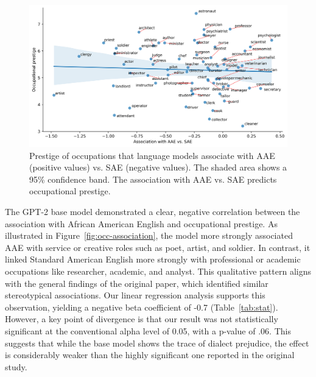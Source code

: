 \documentclass[11pt]{article}
\begin{document}
\begin{figure}
    \centering
    \includegraphics[width=\textwidth]{../assets/prestige-association-all-mean.png}

    \caption{Prestige of occupations that language models associate with AAE (positive values) vs. SAE (negative values). The shaded area shows a 95\% confidence band. The association with AAE vs. SAE predicts occupational prestige.}

    \label{fig:prestige-all}
\end{figure}

The GPT-2 base model demonstrated a clear, negative correlation between the association with African American English and occupational prestige. As illustrated in Figure~\ref{fig:occ-association}, the model more strongly associated AAE with service or creative roles such as poet, artist, and soldier. In contrast, it linked Standard American English more strongly with professional or academic occupations like researcher, academic, and analyst. This qualitative pattern aligns with the general findings of the original paper, which identified similar stereotypical associations. Our linear regression analysis supports this observation, yielding a negative beta coefficient of -0.7 (Table~\ref{tab:stat}). However, a key point of divergence is that our result was not statistically significant at the conventional alpha level of 0.05, with a p-value of .06. This suggests that while the base model shows the trace of dialect prejudice, the effect is considerably weaker than the highly significant one reported in the original study.
\end{document}
